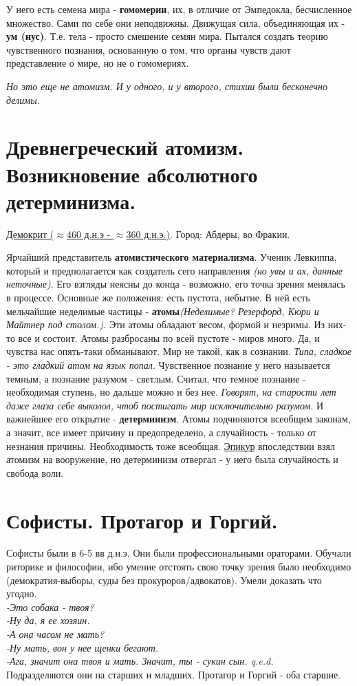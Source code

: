 У него есть семена мира - \textbf{гомомерии}, их, в отличие от Эмпедокла, бесчисленное множество. Сами по себе они неподвижны. Движущая сила, объединяющая их - \textbf{ум (нус)}. Т.е. тела - просто смешение семян мира. Пытался создать теорию чувственного познания, основанную о том, что органы чувств дают представление о мире, но не о гомомериях. 

\textit{Но это еще не атомизм. И у одного, и у второго, стихии были бесконечно делимы.} 

\section{Древнегреческий атомизм. Возникновение абсолютного детерминизма.}
\underline{Демокрит ($\approx$460 д.н.э - $\approx$360 д.н.э.)}. Город: Абдеры, во Фракии.

Ярчайший представитель \textbf{атомистического материализма}.
Ученик Левкиппа, который и предполагается как создатель сего направления \textit{(но увы и ах, данные неточные)}.
Его взгляды неясны до конца - возможно, его точка зрения менялась в процессе. Основные же положения:
есть пустота, небытие. В ней есть мельчайшие неделимые частицы - \textbf{атомы}\textit{(Неделимые? Резерфорд, Кюри и Майтнер под столом.)}. Эти атомы обладают весом, формой и незримы. Из них-то все и состоит. Атомы разбросаны по всей пустоте - миров много. Да, и чувства нас опять-таки обманывают. Мир не такой, как в сознании. \textit{Типа, сладкое - это гладкий атом на язык попал}. Чувственное познание у него называется темным, а познание разумом - светлым. Считал, что темное познание - необходимая ступень, но дальше можно и без нее. \textit{Говорят, на старости лет даже глаза себе выколол, чтоб постигать мир исключительно разумом}. И важнейшее его открытие - \textbf{детерминизм}. Атомы подчиняются всеобщим законам, а значит, все имеет причину и предопределено, а случайность - только от незнания причины. Необходимость тоже всеобщая. \underline{Эпикур} впоследствии взял атомизм на вооружение, но детерминизм отвергал - у него была случайность и свобода воли.

\section{Софисты. Протагор и Горгий.}
Софисты были в 6-5 вв д.н.э. Они были профессиональными ораторами. Обучали риторике и философии, ибо умение отстоять свою точку зрения было необходимо (демократия-выборы, суды без прокуроров/адвокатов). Умели доказать что угодно.
\textit{\\-Это собака - твоя?\\ -Ну да, я ее хозяин.\\-А она часом не мать?\\-Ну мать, вон у нее щенки бегают.\\-Ага, значит она твоя и мать. Значит, ты - сукин сын. q.e.d.}\\
Подразделяются они на старших и младших. Протагор и Горгий - оба старшие.

